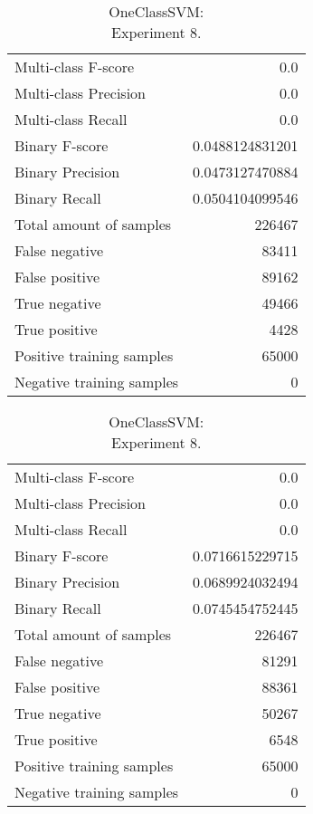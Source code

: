\begin{table}[H]
\begin{minipage}{0.5\textwidth}
\caption{OneClassSVM: \\Experiment 7.}
\centering
\begin{tabular}{l r}
\toprule
Multi-class F-score & 0.0 \\
Multi-class Precision & 0.0 \\
Multi-class Recall & 0.0 \\
\midrule
Binary F-score & 0.0488124831201 \\
Binary Precision & 0.0473127470884 \\
Binary Recall & 0.0504104099546 \\
\midrule
Total amount of samples & 226467 \\
False negative & 83411 \\
False positive & 89162 \\
True negative & 49466 \\
True positive & 4428 \\
\midrule
Positive training samples & 65000 \\
Negative training samples & 0 \\
\bottomrule
\end{tabular}
\end{minipage}
\hfillx
\begin{minipage}{0.5\textwidth}
\caption{OneClassSVM: \\Experiment 8.}
\centering
\begin{tabular}{l r}
\toprule
Multi-class F-score & 0.0 \\
Multi-class Precision & 0.0 \\
Multi-class Recall & 0.0 \\
\midrule
Binary F-score & 0.0716615229715 \\
Binary Precision & 0.0689924032494 \\
Binary Recall & 0.0745454752445 \\
\midrule
Total amount of samples & 226467 \\
False negative & 81291 \\
False positive & 88361 \\
True negative & 50267 \\
True positive & 6548 \\
\midrule
Positive training samples & 65000 \\
Negative training samples & 0 \\
\bottomrule
\end{tabular}
\end{minipage}
\end{table}
